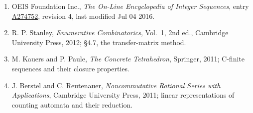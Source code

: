 \documentclass[11pt]{article}
\theoremstyle{definition}
\begin{document}
\begin{enumerate}

\item OEIS Foundation Inc., \emph{The On-Line Encyclopedia of Integer Sequences}, entry \href{https://oeis.org/A274752}{A274752}, revision 4, last modified Jul 04 2016.

\item R. P. Stanley, \emph{Enumerative Combinatorics}, Vol.~1, 2nd ed., Cambridge University Press, 2012; \S4.7, the transfer-matrix method.

\item M. Kauers and P. Paule, \emph{The Concrete Tetrahedron}, Springer, 2011; C-finite sequences and their closure properties.

\item J. Berstel and C. Reutenauer, \emph{Noncommutative Rational Series with Applications}, Cambridge University Press, 2011; linear representations of counting automata and their reduction.

\end{enumerate}
\end{document}
